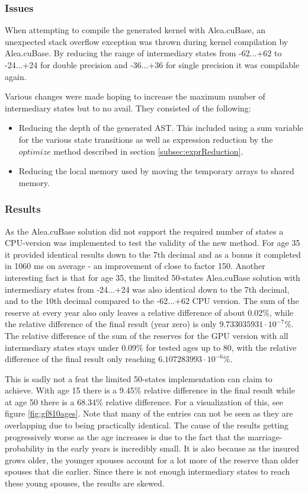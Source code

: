 \subsubsection{Issues}
When attempting to compile the generated kernel with Alea.cuBase, an unexpected stack overflow exception was thrown during kernel compilation by Alea.cuBase.
By reducing the range of intermediary states from -62...+62 to -24...+24 for double precision and -36...+36 for single precision it was compilable again.

Various changes were made hoping to increase the maximum number of intermediary states but to no avail.
They consisted of the following:
\begin{itemize}
\item Reducing the depth of the generated AST. This included using a sum variable for the various state transitions as well as expression reduction by the $optimize$ method described in section \ref{subsec:exprReduction}.
\item Reducing the local memory used by moving the temporary arrays to shared memory.
\end{itemize}

\subsubsection{Results}
As the Alea.cuBase solution did not support the required number of states a CPU-version was implemented to test the validity of the new method.
For age 35 it provided identical results down to the 7th decimal and as a bonus it completed in 1060 ms on average - an improvement of close to factor 150.
Another interesting fact is that for age 35, the limited 50-states Alea.cuBase solution with intermediary states from -24...+24 was also identical down to the 7th decimal, and to the 10th decimal compared to the -62...+62 CPU version.
The sum of the reserve at every year also only leaves a relative difference of about 0.02\%, while the relative difference of the final result (year zero) is only $9.733035931 \cdot 10^{-7}\%$.
The relative difference of the sum of the reserves for the GPU version with all intermediary states stays under 0.09\% for tested ages up to 80, with the relative difference of the final result only reaching $6.107283993 \cdot 10^{-6}$\%.

This is sadly not a feat the limited 50-states implementation can claim to achieve. 
With age 15 there is a 9.45\% relative difference in the final result while at age 50 there is a 68.34\% relative difference.
For a visualization of this, see figure \ref{fig:gf810ages}. 
Note that many of the entries can not be seen as they are overlapping due to being practically identical.
The cause of the results getting progressively worse as the age increases is due to the fact that the marriage-probability in the early years is incredibly small.
It is also because as the insured grows older, the younger spouses account for a lot more of the reserve than older spouses that die earlier.
Since there is not enough intermediary states to reach these young spouses, the results are skewed.

